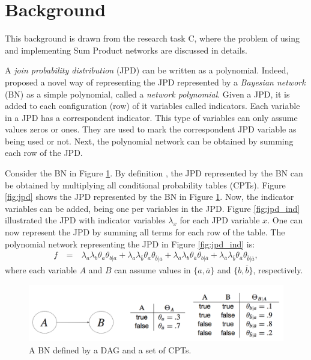 \section{Background}
\label{sec:back}

This background is drawn from the research task C, where the problem of using and implementing Sum Product networks are discussed in details.

A \emph{join probability distribution} (JPD) can be written as a polynomial.
Indeed, \cite{Darwiche2009} proposed a novel way of representing the JPD represented by a \emph{Bayesian network} (BN) as a simple polynomial, called a \emph{network polynomial}.
Given a JPD, it is added to each configuration (row) of it variables called indicators.
Each variable in a JPD has a correspondent indicator.
This type of variables can only assume values zeros or ones.
They are used to mark the correspondent JPD variable as being used or not.
Next, the polynomial network can be obtained by summing each row of the JPD.


\begin{example}
Consider the BN in Figure \ref{fig:bn}.
By definition \citep{Koller:2009wk}, the JPD represented by the BN can be obtained by multiplying all conditional probability tables (CPTs).
Figure \ref{fig:jpd} shows the JPD represented by the BN in Figure \ref{fig:bn}.
Now, the indicator variables can be added, being one per variables in the JPD.
Figure \ref{fig:jpd_ind} illustrated the JPD with indicator variables $\lambda_x$ for each JPD variable $x$.
One can now represent the JPD by summing all terms for each row of the table.
The polynomial network representing the JPD in Figure \ref{fig:jpd_ind} is:
\begin{eqnarray}
    f ~&=&~ \lambda_a \lambda_b \theta_a \theta_{b|a}
    + \lambda_a \lambda_{\overline{b}} \theta_a \theta_{\overline{b}|a}
    + \lambda_{\overline{a}} \lambda_b \theta_{\overline{a}} \theta_{b|\overline{a}}
    + \lambda_{\overline{a}} \lambda_{\overline{b}} \theta_{\overline{a}} \theta_{\overline{b}|\overline{a}}, \label{eq:np}
\end{eqnarray}
where each variable $A$ and $B$ can assume values in $\{a, \overline{a}\}$ and $\{b, \overline{b}\}$, respectively.
\end{example}

\begin{figure}[hbt]
    \begin{center}
    \includegraphics[width=\textwidth]{figures/bn.png}
    \caption{A BN defined by a DAG and a set of CPTs.}
    \label{fig:bn}
    \end{center}
\end{figure}

